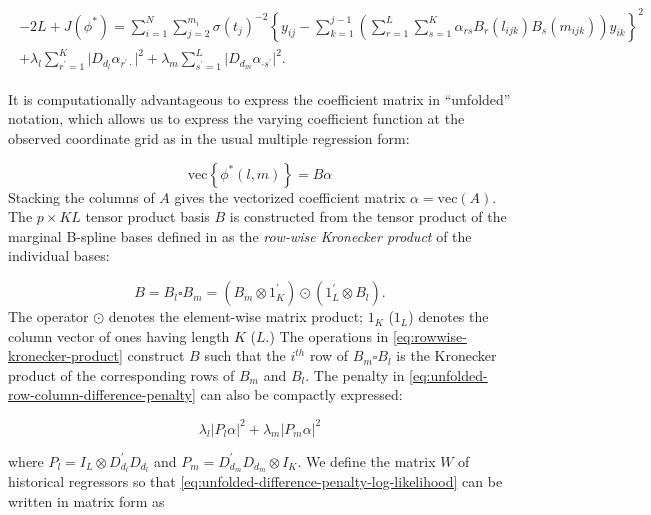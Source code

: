 \documentclass[12pt]{article}
\newcommand{\ms}{\scriptscriptstyle}
\theoremstyle{definition}
\begin{document}
\begin{align} 
\begin{split}\label{eq:unfolded-difference-penalty-log-likelihood}
-2L + J\left(\phi^*\right) = \sum_{i=1}^N \sum_{j=2}^{m_i} \sigma\left({t_j}\right)^{-2} \left\{y_{ij} - \sum_{k=1}^{j-1} \left( \sum_{r=1}^L \sum_{s=1}^K \alpha_{rs} B_r\left(l_{ijk}\right)B_s\left(m_{ijk}\right)\right)y_{ik} \right\}^2 \\ 
+ \lambda_l \sum_{r^\prime=1}^K \vert D_{d_{\ms l}} \alpha_{r^\prime \cdot} \vert^2 + \lambda_m \sum_{s^\prime=1}^L \vert D_{d_{\ms m}} \alpha_{\cdot s^\prime} \vert^2.
\end{split}
\end{align}

It is computationally advantageous to express the coefficient matrix in ``unfolded'' notation, which allows us to express the varying coefficient function at the observed coordinate grid as in the usual multiple regression form:

\begin{equation*}
\mbox{vec}\left\{\phi^*\left(l,m\right)\right\} = B \alpha
\end{equation*}
\noindent
Stacking the columns of $A$ gives the vectorized coefficient matrix $\alpha = \mbox{vec}\left( A \right)$. The $p \times KL$ tensor product basis $B$ is constructed from the tensor product of the marginal B-spline bases defined in \citet{eilers2006fast} as the \textit{row-wise Kronecker product} of the individual bases:

\begin{equation} \label{eq:rowwise-kronecker-product}
B = B_l \square B_m = \left( B_m \otimes 1^\prime_{K} \right) \odot \left(1^\prime_{L} \otimes  B_l  \right).
\end{equation}
\noindent
The operator $\odot$ denotes the element-wise matrix product; $1_K$ ($1_L$) denotes the column vector of ones having length $K$ ($L$.) The operations in \ref{eq:rowwise-kronecker-product} construct $B$ such that the $i^{th}$ row of $B_m\square B_l$ is the Kronecker product of the corresponding rows of $B_m$ and $B_l$. The penalty in \ref{eq:unfolded-row-column-difference-penalty} can also be compactly expressed:

\begin{equation} \label{eq:tensor-product-penalty}
\lambda_l \vert P_l \alpha \vert^2 + \lambda_m \vert P_m \alpha \vert^2
\end{equation}

where $P_l = I_L \otimes D_{d_{\ms l}}^\prime D_{d_{\ms l}} $ and $P_m =  D_{d_{\ms m}}^\prime D_{d_{\ms m}} \otimes I_K$. We define the matrix $W$ of historical regressors so that \ref{eq:unfolded-difference-penalty-log-likelihood} can be written in matrix form as
\end{document}
